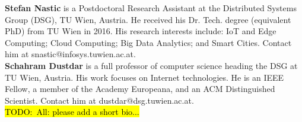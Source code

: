\documentclass[conference]{IEEEtran}
\newcommand{\todo}[1]{\hl{TODO:~#1}}
\begin{document}
\textbf{Stefan Nastic} is a Postdoctoral Research Assistant at the Distributed Systems Group (DSG), 
TU Wien, Austria.  He received his Dr. Tech. degree (equivalent PhD)
from TU Wien in 2016.  
His research interests include: IoT and Edge Computing; 
Cloud Computing; Big Data Analytics; and Smart Cities.
Contact him at snastic@infosys.tuwien.ac.at. \\

\textbf{Schahram Dustdar} 
is a full professor of computer science heading the DSG at TU 
Wien, Austria. His work focuses on Internet technologies. He is an IEEE Fellow, a member 
of the Academy Europeana, and an ACM Distinguished Scientist. Contact him at 
dustdar@dsg.tuwien.ac.at.\\

\todo{All: please add a short bio...}


\balance



\end{document}
